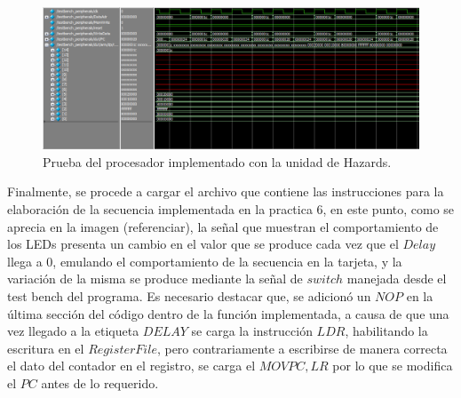 \begin{figure}[H]
	\centering
	\includegraphics[width = \linewidth]{images/SGCH.PNG}
	\caption{Prueba del procesador implementado con la unidad de Hazards.}
	\label{fig:Código guiá con unidad de Hazards}
\end{figure}

Finalmente, se procede a cargar el archivo que contiene las instrucciones para la elaboración de la secuencia implementada en la practica 6, en este punto, como se aprecia en la imagen (referenciar), la señal que muestran el comportamiento de los LEDs presenta un cambio en el valor que se produce cada vez que el $Delay$ llega a 0, emulando el comportamiento de la secuencia en la tarjeta, y la variación de la misma se produce mediante la señal de $switch$ manejada desde el test bench del programa. Es necesario destacar que, se adicionó un $NOP$ en la última sección del código dentro de la función implementada, a causa de que una vez llegado a la etiqueta $DELAY$ se carga la instrucción $LDR$, habilitando la escritura en el $Register File$, pero contrariamente a escribirse de manera correcta el dato del contador en el registro, se carga el $MOV PC, LR$ por lo que se modifica el $PC$ antes de lo requerido.\\

